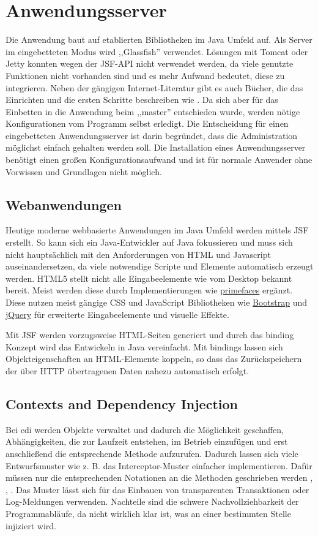 \documentclass[oneside, ngerman, toc=bibliography,bibliography=totoc,listof=entryprefix, open=right,numbers=noenddot,fontsize=12pt]{scrbook}
\begin{document}
\section{Anwendungsserver}
\label{chap:appserv}
Die Anwendung baut auf etablierten Bibliotheken im Java Umfeld auf. Als Server im eingebetteten Modus wird ,,Glassfish'' verwendet.
Lösungen mit Tomcat oder Jetty konnten wegen der JSF-API nicht verwendet werden, da viele genutzte Funktionen nicht vorhanden sind und es mehr Aufwand bedeutet, diese zu integrieren. Neben der gängigen Internet-Literatur gibt es auch Bücher, die das Einrichten und die ersten Schritte beschreiben wie \cite{glassfishee7}. Da sich aber für das Einbetten in die Anwendung beim ,,master'' entschieden wurde, werden nötige Konfigurationen vom Programm selbst erledigt.
Die Entscheidung für einen eingebetteten Anwendungsserver ist darin begründet, dass die Administration möglichst einfach gehalten werden soll.
Die Installation eines Anwendungsserver benötigt einen großen Konfigurationsaufwand und ist für normale Anwender ohne Vorwissen und Grundlagen nicht möglich.


\subsection{Webanwendungen}
Heutige moderne webbasierte Anwendungen im Java Umfeld werden mittels {JSF} erstellt. So kann sich ein Java-Entwickler auf Java fokussieren und muss sich nicht hauptsächlich mit den Anforderungen von HTML und Javascript auseinandersetzen, da viele notwendige Scripte und Elemente automatisch erzeugt werden. HTML5 stellt nicht alle Eingabeelemente wie vom Desktop bekannt bereit. Meist werden diese durch Implementierungen wie \href{http://primefaces.org/}{{primefaces}} ergänzt. Diese nutzen meist gängige {CSS} und {JavaScript} Bibliotheken wie \href{http://getbootstrap.com/}{Bootstrap} und \href{https://jquery.com/}{jQuery} für erweiterte Eingabeelemente und visuelle Effekte.

Mit JSF  werden vorzugsweise HTML-Seiten generiert und durch das binding Konzept wird das Entwickeln in Java vereinfacht.
Mit bindings lassen sich Objekteigenschaften an HTML-Elemente koppeln, so dass das Zurückspeichern der über HTTP übertragenen Daten nahezu automatisch erfolgt.

\subsection{Contexts and Dependency Injection}
Bei \acrfull{cdi} werden Objekte verwaltet und dadurch die Möglichkeit geschaffen, Abhängigkeiten, die zur Laufzeit entstehen, im Betrieb einzufügen und erst anschließend die entsprechende Methode aufzurufen. Dadurch lassen sich viele Entwurfsmuster wie z. B. das Interceptor-Muster einfacher implementieren. Dafür müssen nur die entsprechenden Notationen an die Methoden geschrieben werden \cite{schmidt2002pattern}, \cite{gamma2011entwurfsmuster}, \cite{bien2003j2ee}. Das Muster lässt sich für das Einbauen von transparenten Transaktionen oder Log-Meldungen verwenden. Nachteile sind die schwere Nachvollziehbarkeit der Programmabläufe, da nicht wirklich klar ist, was an einer bestimmten Stelle injiziert wird.
\end{document}
